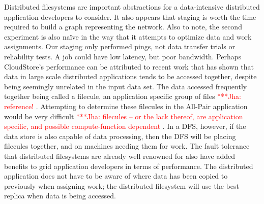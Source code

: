 \documentclass[a4paper,11pt]{article}
\newcommand{\jhanote}[1]{ {\textcolor{red} { ***Jha: #1 }}}
\newcommand{\jhanote}[1]{}
\begin{document}
Distributed filesystems are important abstractions for a data-intensive distributed application developers to consider. It also appears that staging is worth the time required to build a graph representing the network.  Also to note, the second experiment is also naïve in the way that it attempts to optimize data and work assignments. Our staging only performed pings, not data transfer trials or reliability tests. A job could have low latency, but poor bandwidth. Perhaps CloudStore's performance can be attributed to recent work that has shown that data in large scale distributed applications tends to be accessed together, despite being seemingly unrelated in the input data set. The data accessed frequently together being called a filecule, an application specific group of files \jhanote{reference!}. Attempting to determine these filecules in the All-Pair application would be very difficult\jhanote{filecules -- or the lack thereof, are application specific, and possible compute-function dependent}. In a DFS, however, if the data store is also capable of data processing, then the DFS will be placing filecules together, and on machines needing them for work. The fault tolerance that distributed filesystems are already well renowned for also have added benefits to grid application developers in terms of performance. The distributed application does not have to be aware of where data has been copied to previously when assigning work; the distributed filesystem will use the best replica when data is being accessed.

 

\end{document}
